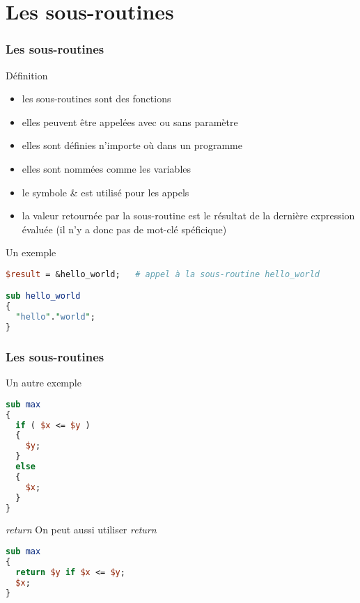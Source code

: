 \section{Les sous-routines}

\begin{frame}[fragile]
  \frametitle{Les sous-routines}

  \begin{block}{Définition}
    \begin{itemize}
    \item les sous-routines sont des fonctions
    \item elles peuvent être appelées avec ou sans paramètre
    \item elles sont définies n'importe où dans un programme
    \item elles sont nommées comme les variables
    \item le symbole \& est utilisé pour les appels
    \item la valeur retournée par la sous-routine est le résultat de la
      dernière expression évaluée (il n'y a donc pas de mot-clé spéficique)
    \end{itemize}
  \end{block}

  \begin{exampleblock}{Un exemple}
    \begin{lstlisting}[language=perl]
$result = &hello_world;   # appel à la sous-routine hello_world

sub hello_world
{
  "hello"."world";
}
    \end{lstlisting}
  \end{exampleblock}
\end{frame}

\begin{frame}[fragile]
  \frametitle{Les sous-routines}

  \begin{alertblock}{Un autre exemple}
    \begin{lstlisting}[language=perl]
sub max
{
  if ( $x <= $y )
  {
    $y;
  }
  else
  {
    $x;
  }
}
    \end{lstlisting}
  \end{alertblock}
  \begin{block}{\textit{return}}
    On peut aussi utiliser \textit{return}
    \begin{lstlisting}[language=perl]
sub max
{
  return $y if $x <= $y;
  $x;
}
    \end{lstlisting}
  \end{block}

\end{frame}

